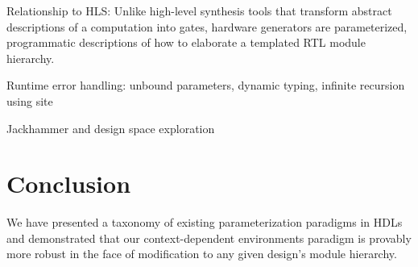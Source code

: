 Relationship to HLS: Unlike high-level synthesis tools that transform abstract descriptions of a computation into gates, hardware generators are parameterized, programmatic descriptions of how to elaborate a templated RTL module hierarchy.

Runtime error handling: unbound parameters, dynamic typing, infinite recursion using site

Jackhammer and design space exploration

\section{Conclusion}
\label{sec:con}

We have presented a taxonomy of existing parameterization paradigms in HDLs and demonstrated that our context-dependent environments paradigm is provably more robust in the face of modification to any given design's module hierarchy. 

